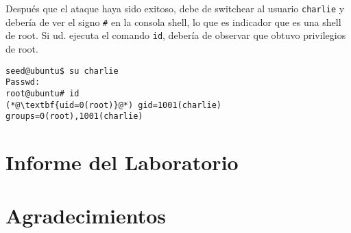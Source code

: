 Después que el ataque haya sido exitoso, debe de switchear al usuario  \texttt{charlie} y debería de ver el signo \texttt{\#} en la consola shell, lo que es indicador que es una shell de root. Si ud. ejecuta el comando \texttt{id}, debería de observar que obtuvo privilegios de root.

\begin{lstlisting}
seed@ubuntu$ su charlie
Passwd: 
root@ubuntu# id
(*@\textbf{uid=0(root)}@*) gid=1001(charlie) groups=0(root),1001(charlie)
\end{lstlisting}
 


\section{Informe del Laboratorio}




\section*{Agradecimientos}






